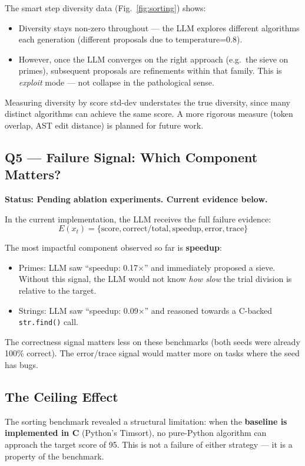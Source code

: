 \documentclass[11pt,a4paper]{article}
\begin{document}
The smart step diversity data (Fig.~\ref{fig:sorting}) shows:
\begin{itemize}
  \item Diversity stays non-zero throughout — the LLM explores different
    algorithms each generation (different proposals due to temperature=0.8).
  \item However, once the LLM converges on the right approach (e.g.\ the
    sieve on primes), subsequent proposals are refinements within that family.
    This is \emph{exploit} mode — not collapse in the pathological sense.
\end{itemize}

Measuring diversity by score std-dev understates the true diversity, since
many distinct algorithms can achieve the same score. A more rigorous
measure (token overlap, AST edit distance) is planned for future work.

\subsection{Q5 — Failure Signal: Which Component Matters?}

\textbf{Status: Pending ablation experiments. Current evidence below.}

In the current implementation, the LLM receives the full failure evidence:
\[
  E(x_t) = \{\text{score}, \text{correct}/\text{total}, \text{speedup}, \text{error}, \text{trace}\}
\]

The most impactful component observed so far is \textbf{speedup}:
\begin{itemize}
  \item Primes: LLM saw ``speedup: 0.17$\times$'' and immediately proposed
    a sieve. Without this signal, the LLM would not know \emph{how slow}
    the trial division is relative to the target.
  \item Strings: LLM saw ``speedup: 0.09$\times$'' and reasoned towards
    a C-backed \texttt{str.find()} call.
\end{itemize}

The correctness signal matters less on these benchmarks (both seeds were
already 100\% correct). The error/trace signal would matter more on tasks
where the seed has bugs.

\subsection{The Ceiling Effect}
\label{sec:ceiling}

The sorting benchmark revealed a structural limitation: when the \textbf{baseline
is implemented in C} (Python's Timsort), no pure-Python algorithm can approach
the target score of 95. This is not a failure of either strategy — it is a
property of the benchmark.
\end{document}
